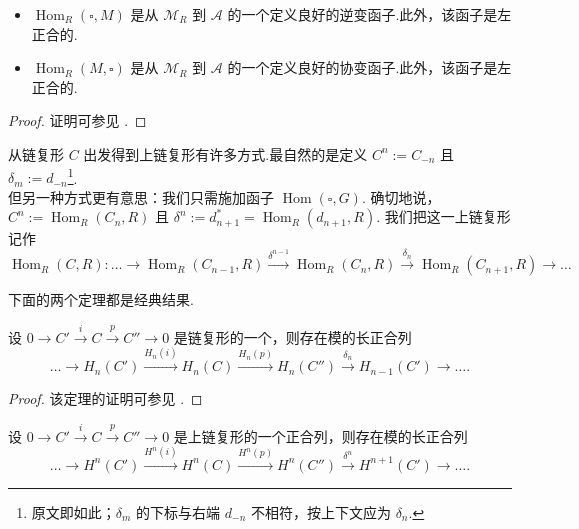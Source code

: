 \begin{proposition}\label{c4-prop-1-1}
\mbox{}
\begin{itemize}
    \item $\operatorname{Hom}_R(\square, M)$ 是从 $\mathscr{M}_R$ 到 $\mathscr A$ 的一个定义良好的逆变函子.此外，该函子是左正合的.
    \item $\operatorname{Hom}_R(M, \square)$ 是从 $\mathscr{M}_R$ 到 $\mathscr A$ 的一个定义良好的协变函子.此外，该函子是左正合的.
\end{itemize}
\end{proposition}

\begin{proof}
证明可参见 \cite[\S2.1]{rot09}.
\end{proof}

\begin{remark}\label{c4-rem-1-11}
从链复形 $C$ 出发得到上链复形有许多方式.最自然的是定义 $C^n:=C_{-n}$ 且 $\delta_m:=d_{-n}$\footnote{原文即如此；$\delta_m$ 的下标与右端 $d_{-n}$ 不相符，按上下文应为 $\delta_n$.}.\\
但另一种方式更有意思：我们只需施加函子 $\operatorname{Hom}(\square, G)$. 确切地说，$C^n:=\operatorname{Hom}_R(C_n, R)$ 且 $\delta^n:=d^*_{n+1}=\operatorname{Hom}_R(d_{n+1}, R)$. 我们把这一上链复形记作
\[
\operatorname{Hom}_R(C, R):\ldots\to\operatorname{Hom}_R(C_{n-1}, R)\xrightarrow{\delta^{n-1}}\operatorname{Hom}_R(C_n, R)\xrightarrow{\delta_n}\operatorname{Hom}_R(C_{n+1}, R)\to\ldots
\]
\end{remark}

下面的两个定理都是经典结果.

\begin{theorem}\label{c4-thm-1-2}
设 $0\to C'\xrightarrow{i}C\xrightarrow{p}C''\to 0$ 是链复形的一个，则存在模的长正合列
\[
\ldots\to H_n(C')\xrightarrow{H_n(i)}H_n(C)\xrightarrow{H_n(p)}H_n(C'')\xrightarrow{\delta_n}H_{n-1}(C')\to\ldots.
\]
\end{theorem}

\begin{proof}
该定理的证明可参见 \cite[\S6.1]{rot09}.
\end{proof}

\begin{theorem}\label{c4-thm-1-3}
设 $0\to C'\xrightarrow{i}C\xrightarrow{p}C''\to 0$ 是上链复形的一个正合列，则存在模的长正合列
\[
\ldots\to H^n(C')\xrightarrow{H^n(i)}H^n(C)\xrightarrow{H^n(p)}H^n(C'')\xrightarrow{\delta^n}H^{n+1}(C')\to\ldots.
\]
\end{theorem}

